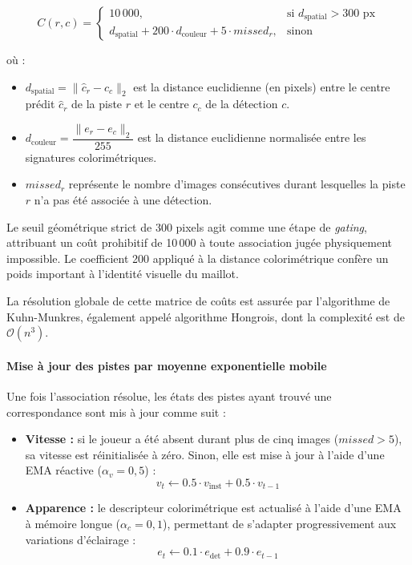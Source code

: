 \[
C(r,c)=
\begin{cases}
10\,000, & \text{si } d_{\text{spatial}} > 300 \text{ px} \\
d_{\text{spatial}} + 200 \cdot d_{\text{couleur}} + 5 \cdot missed_r, & \text{sinon}
\end{cases}
\tag{2.6}
\]

où :

\begin{itemize}
    \item $d_{\text{spatial}} = \|\hat{c}_r - c_c\|_2$ est la distance euclidienne (en pixels) entre le centre prédit $\hat{c}_r$ de la piste $r$ et le centre $c_c$ de la détection $c$.
    \item $d_{\text{couleur}} = \dfrac{\|e_r - e_c\|_2}{255}$ est la distance euclidienne normalisée entre les signatures colorimétriques.
    \item $missed_r$ représente le nombre d’images consécutives durant lesquelles la piste $r$ n’a pas été associée à une détection.
\end{itemize}

Le seuil géométrique strict de 300 pixels agit comme une étape de \textit{gating}, attribuant un coût prohibitif de 10\,000 à toute association jugée physiquement impossible. Le coefficient 200 appliqué à la distance colorimétrique confère un poids important à l’identité visuelle du maillot.

La résolution globale de cette matrice de coûts est assurée par l’algorithme de Kuhn-Munkres, également appelé algorithme Hongrois, dont la complexité est de $\mathcal{O}(n^3)$.

\paragraph{Mise à jour des pistes par moyenne exponentielle mobile}

Une fois l’association résolue, les états des pistes ayant trouvé une correspondance sont mis à jour comme suit :

\begin{itemize}
    \item \textbf{Vitesse :} si le joueur a été absent durant plus de cinq images ($missed > 5$), sa vitesse est réinitialisée à zéro. Sinon, elle est mise à jour à l’aide d’une EMA réactive ($\alpha_v = 0{,}5$) :
    \[
    v_t \leftarrow 0.5 \cdot v_{\text{inst}} + 0.5 \cdot v_{t-1}
    \]

    \item \textbf{Apparence :} le descripteur colorimétrique est actualisé à l’aide d’une EMA à mémoire longue ($\alpha_c = 0{,}1$), permettant de s’adapter progressivement aux variations d’éclairage :
    \[
    e_t \leftarrow 0.1 \cdot e_{\text{det}} + 0.9 \cdot e_{t-1}
    \]
\end{itemize}

